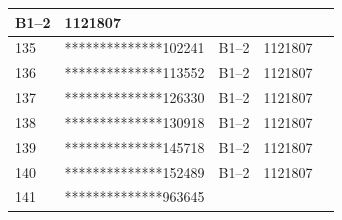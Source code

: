 \documentclass[UTF8,10pt,a4paper,fontset=fandol]{ctexart}
\newcommand{\fieldvalue}[1]{#1}
\begin{document}
\begin{center}
\begin{tabular}{|p{1.0cm}|p{3.8cm}|p{2.3cm}|p{2.8cm}|p{2.2cm}|}
\fieldvalue{B1--2} &
\fieldvalue{1121807} & \\ \hline
\fieldvalue{135} &
\fieldvalue{**************102241} &
\fieldvalue{B1--2} &
\fieldvalue{1121807} & \\ \hline
\fieldvalue{136} &
\fieldvalue{**************113552} &
\fieldvalue{B1--2} &
\fieldvalue{1121807} & \\ \hline
\fieldvalue{137} &
\fieldvalue{**************126330} &
\fieldvalue{B1--2} &
\fieldvalue{1121807} & \\ \hline
\fieldvalue{138} &
\fieldvalue{**************130918} &
\fieldvalue{B1--2} &
\fieldvalue{1121807} & \\ \hline
\fieldvalue{139} &
\fieldvalue{**************145718} &
\fieldvalue{B1--2} &
\fieldvalue{1121807} & \\ \hline
\fieldvalue{140} &
\fieldvalue{**************152489} &
\fieldvalue{B1--2} &
\fieldvalue{1121807} & \\ \hline
\fieldvalue{141} &
\fieldvalue{**************963645} &

\end{tabular}
\end{center}
\end{document}
